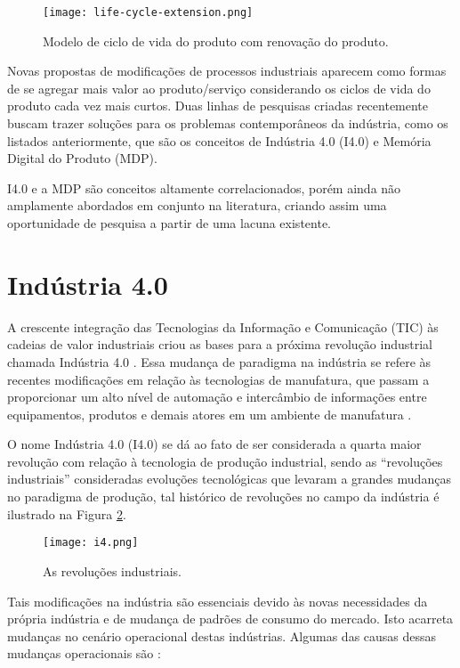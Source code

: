 	\begin{figure}[hbt!]
		\centering
		\caption{Modelo de ciclo de vida do produto com renovação do produto.}
		\texttt{[image: life-cycle-extension.png]}
		\label{fig:life-cycle-extension}
	\end{figure}
	
	Novas propostas de modificações de processos industriais aparecem como formas de se agregar mais valor ao produto/serviço considerando os ciclos de vida do produto cada vez mais curtos. Duas linhas de pesquisas criadas recentemente buscam trazer soluções para os problemas contemporâneos da indústria, como os listados anteriormente, que são os conceitos de Indústria 4.0 (I4.0) e Memória Digital do Produto (MDP).
	
	I4.0 e a MDP são conceitos altamente correlacionados, porém ainda não amplamente abordados em conjunto na literatura, criando assim uma oportunidade de pesquisa a partir de uma lacuna existente.
	
	
\section{Indústria 4.0}

	A crescente integração das Tecnologias da Informação e Comunicação (TIC) às cadeias de valor industriais criou as bases para a próxima revolução industrial chamada Indústria 4.0 \cite{hermann2016design}. Essa mudança de paradigma na indústria se refere às recentes modificações em relação às tecnologias de manufatura, que passam a proporcionar um alto nível de automação e intercâmbio de informações entre equipamentos, produtos e demais atores em um ambiente de manufatura \cite{lasi2014industryfour}. 
	
	O nome Indústria 4.0 (I4.0) se dá ao fato de ser considerada a quarta maior revolução com relação à tecnologia de produção industrial, sendo as ``revoluções industriais'' consideradas evoluções tecnológicas que levaram a grandes mudanças no paradigma de produção, tal histórico de revoluções no campo da indústria é ilustrado na Figura \ref{fig:i4}.

	\begin{figure}[hbt!]
		\centering
		\caption{As revoluções industriais.}
		\texttt{[image: i4.png]}
		\label{fig:i4}
	\end{figure}

	Tais modificações na indústria são essenciais devido às novas necessidades da própria indústria e de mudança de padrões de consumo do mercado. Isto acarreta mudanças no cenário operacional destas indústrias. Algumas das causas dessas mudanças operacionais são \cite{lasi2014industryfour}:
	
